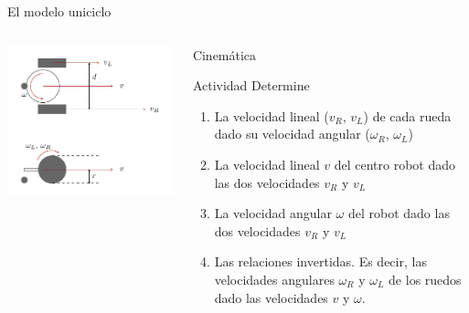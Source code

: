 \documentclass[presentation,aspectratio=169]{beamer}
\begin{document}
\begin{frame}[label={sec:orgf806687}]{El modelo uniciclo}
\begin{columns}
\begin{column}{0.4\columnwidth}
\begin{center}
 \includegraphics[width=1.0\linewidth]{../figures/unicycle-model-details}
\end{center}
\end{column}

\begin{column}{0.6\columnwidth}
\alert{Cinemática}

\pause

\alert{Actividad} Determine

\begin{enumerate}
\item La velocidad lineal (\(v_R\), \(v_L\)) de cada rueda dado su velocidad angular (\(\omega_R\), \(\omega_L\))

\item La velocidad lineal \(v\) del centro robot dado las dos velocidades \(v_R\) y \(v_L\)

\item La velocidad angular \(\omega\) del robot dado las dos velocidades \(v_R\) y \(v_L\)

\item Las relaciones invertidas. Es decir, las velocidades angulares \(\omega_R\) y \(\omega_L\) de los ruedos dado las velocidades \(v\) y \(\omega\).
\end{enumerate}
\end{column}
\end{columns}
\end{frame}
\end{document}
